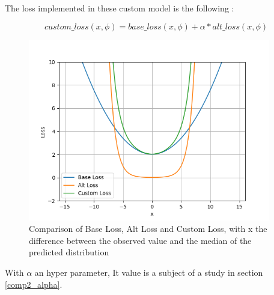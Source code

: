 The loss implemented in these custom model is the following :

\begin{equation}
    custom\_loss(x,\phi ) = base\_loss(x,\phi ) + \alpha * alt\_loss(x,\phi )
\end{equation}



\begin{figure}[!h]
    \centering
    \includegraphics[width=400px]{base_loss_vs_custom_loss.png}
    \caption{Comparison of Base Loss, Alt Loss and Custom Loss, with x the difference between the observed value and
    the median of the predicted distribution}
    \label{fig:customloss}
\end{figure}

With $\alpha$ an hyper parameter, It value is a subject of a study in section \ref{comp2_alpha}.



